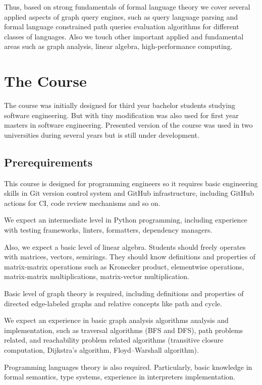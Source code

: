 \documentclass[sigconf]{acmart}
\begin{document}
Thus, based on strong fundamentals of formal language theory we cover several applied aspects of graph query engines, such as query language parsing and formal language constrained path queries evaluation algorithms for different classes of languages.
Also we touch other important applied and fundamental areas such as graph analysis, linear algebra, high-performance computing.

\section{The Course}

The course was initially designed for third year bachelor students studying software engineering.
But with tiny modification was also used for first year masters in software engineering.
Presented version of the course was used in two universities during several years but is still under development.

\subsection{Prerequirements}

This course is designed for programming engineers so it requires basic engineering skills in Git version control system and GitHub infrastructure, including GitHub actions for CI, code review mechanisms and so on.

We expect an intermediate level in Python programming, including experience with testing frameworks, linters, formatters, dependency managers. 

Also, we expect a basic level of linear algebra.
Students should freely operates with matrices, vectors, semirings.
They should know definitions and properties of matrix-matrix operations such as Kronecker product, elementwise operations, matrix-matrix multiplications, matrix-vector multiplication. 

Basic level of graph theory is required, including definitions and properties of directed edge-labeled graphs and relative concepts like path and cycle.

We expect an experience in basic graph analysis algorithms analysis and implementation, such as traversal algorithms (BFS and DFS), path problems related, and reachability problem related algorithms (transitive closure computation, Dijkstra's algorithm, Floyd–Warshall algorithm).

Programming languages theory is also required. 
Particularly, basic knowledge in formal semantics, type systems, experience in interpreters implementation.
\end{document}
